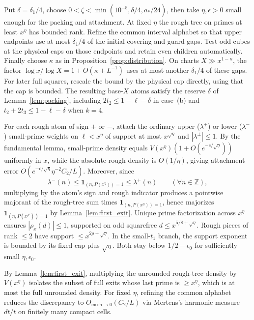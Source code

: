 \documentclass[11pt,reqno]{amsart}
\theoremstyle{remark}
\newcommand{\ind}{\mathbf{1}}
\numberwithin{equation}{section}
\begin{document}
Put $\delta=\delta_1/4$, choose $0<\zeta<\min(10^{-5},\delta/4,a_*/24)$, then take $\eta,\epsilon>0$ small enough for the packing and attachment. At fixed $\eta$ the rough tree on primes at least $x^\eta$ has bounded rank. Refine the common interval alphabet so that upper endpoints use at most $\delta_1/4$ of the initial covering and guard gaps. Test odd cubes at the physical caps on those endpoints and retain even children automatically. Finally choose $\kappa$ as in Proposition~\ref{prop:distribution}. On charts $X\gg x^{1-\kappa}$, the factor $\log x/\log X=1+O(\kappa+L^{-1})$ uses at most another $\delta_1/4$ of these gaps. For later full squares, rescale the bound by the physical cap directly, using that the cap is bounded. The resulting base-$X$ atoms satisfy the reserve $\delta$ of Lemma~\ref{lem:packing}, including $2t_2\le1-\ell-\delta$ in case~(b) and $t_2+2t_3\le1-\ell-\delta$ when $k=4$.

For each rough atom of sign $+$ or $-$, attach the ordinary upper ($\lambda^+$) or lower ($\lambda^-$) small-prime weights on $\ell < x^\eta$ of support at most $x^{\sqrt{\eta}}$ and $|\lambda^\pm| \le 1$. By the fundamental lemma, small-prime density equals $V(x^\eta)(1 + O(e^{-c/\sqrt{\eta}}))$ uniformly in $x$, while the absolute rough density is $O(1/\eta)$, giving attachment error $O(e^{-c/\sqrt{\eta}}\eta^{-2} C_2/L)$. Moreover, since
\[
\lambda^-(n) \le \ind_{(n, P(x^\eta))=1} \le \lambda^+(n) \qquad (\forall n \in \mathbb{Z}),
\]
multiplying by the atom's sign and rough indicator produces a pointwise majorant of the rough-tree sum times $\ind_{(n,P(x^\eta))=1}$, hence majorizes $\ind_{(n,P(x^{\rho'}))=1}$ by Lemma~\ref{lem:first_exit}. Unique prime factorization across $x^\eta$ ensures $|\rho_x(d)| \le 1$, supported on odd squarefree $d \le x^{5/8+\sqrt{\eta}}$. Rough pieces of rank $\le 2$ have support $\le x^{2\rho+\sqrt{\eta}}$. In the small-$t_1$ branch, the support exponent is bounded by its fixed cap plus $\sqrt{\eta}$. Both stay below $1/2-\epsilon_0$ for sufficiently small $\eta,\epsilon_0$.

By Lemma~\ref{lem:first_exit}, multiplying the unrounded rough-tree density by $V(x^\eta)$ isolates the subset of full exits whose last prime is $\ge x^\eta$, which is at most the full unrounded density. For fixed $\eta$, refining the common alphabet reduces the discrepancy to $O_{\mathrm{mesh}\to 0}(C_2/L)$ via Mertens's harmonic measure $dt/t$ on finitely many compact cells.
\end{document}
